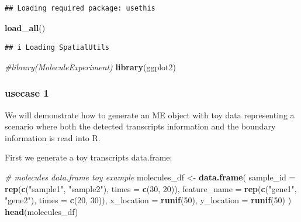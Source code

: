 \documentclass[
]{article}
\newenvironment{Shaded}{\begin{snugshade}}{\end{snugshade}}
\newcommand{\CommentTok}[1]{\textcolor[rgb]{0.56,0.35,0.01}{\textit{#1}}}
\newcommand{\DataTypeTok}[1]{\textcolor[rgb]{0.13,0.29,0.53}{#1}}
\newcommand{\DecValTok}[1]{\textcolor[rgb]{0.00,0.00,0.81}{#1}}
\newcommand{\KeywordTok}[1]{\textcolor[rgb]{0.13,0.29,0.53}{\textbf{#1}}}
\newcommand{\NormalTok}[1]{#1}
\newcommand{\StringTok}[1]{\textcolor[rgb]{0.31,0.60,0.02}{#1}}
\begin{document}
\begin{verbatim}
## Loading required package: usethis
\end{verbatim}

\begin{Shaded}
\begin{Highlighting}[]
\KeywordTok{load\_all}\NormalTok{()}
\end{Highlighting}
\end{Shaded}

\begin{verbatim}
## i Loading SpatialUtils
\end{verbatim}

\begin{Shaded}
\begin{Highlighting}[]
\CommentTok{\#library(MoleculeExperiment)}
\KeywordTok{library}\NormalTok{(ggplot2)}
\end{Highlighting}
\end{Shaded}

\hypertarget{usecase-1}{%
\subsubsection{usecase 1}\label{usecase-1}}

We will demonstrate how to generate an ME object with toy data
representing a scenario where both the detected transcripts information
and the boundary information is read into R.

First we generate a toy transcripts data.frame:

\begin{Shaded}
\begin{Highlighting}[]
\CommentTok{\# molecules data.frame toy example}
\NormalTok{molecules\_df \textless{}{-}}\StringTok{ }\KeywordTok{data.frame}\NormalTok{(}
  \DataTypeTok{sample\_id =} \KeywordTok{rep}\NormalTok{(}\KeywordTok{c}\NormalTok{(}\StringTok{"sample1"}\NormalTok{, }\StringTok{"sample2"}\NormalTok{), }\DataTypeTok{times =} \KeywordTok{c}\NormalTok{(}\DecValTok{30}\NormalTok{, }\DecValTok{20}\NormalTok{)),}
  \DataTypeTok{feature\_name =} \KeywordTok{rep}\NormalTok{(}\KeywordTok{c}\NormalTok{(}\StringTok{"gene1"}\NormalTok{, }\StringTok{"gene2"}\NormalTok{), }\DataTypeTok{times =} \KeywordTok{c}\NormalTok{(}\DecValTok{20}\NormalTok{, }\DecValTok{30}\NormalTok{)),}
  \DataTypeTok{x\_location =} \KeywordTok{runif}\NormalTok{(}\DecValTok{50}\NormalTok{),}
  \DataTypeTok{y\_location =} \KeywordTok{runif}\NormalTok{(}\DecValTok{50}\NormalTok{)}
\NormalTok{  )}
\KeywordTok{head}\NormalTok{(molecules\_df)}
\end{Highlighting}
\end{Shaded}
\end{document}
